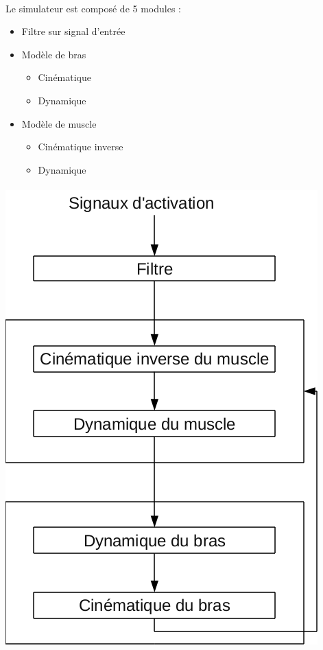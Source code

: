 \documentclass[pdftex,a4paper,11pt]{article}
\begin{document}
\paragraph{}
Le simulateur est composé de 5 modules :
\begin{itemize}
    \item Filtre sur signal d'entrée
    \item Modèle de bras
    \begin{itemize}
        \item Cinématique
        \item Dynamique
    \end{itemize}
    \item Modèle de muscle
    \begin{itemize}
        \item Cinématique inverse
        \item Dynamique
    \end{itemize}
\end{itemize}

\paragraph{}
\begin{center}
        \includegraphics[width=.60\linewidth]{fig/modules}
\end{center}

\end{document}
